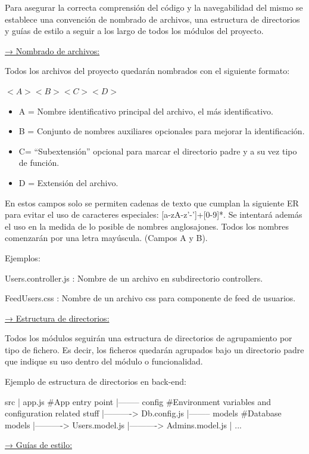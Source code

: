 \documentclass{article}
\begin{document}
Para asegurar la correcta comprensión del código y la navegabilidad del mismo se establece una convención 
de nombrado de archivos, una estructura de directorios y guías de estilo a seguir a los largo de todos los 
módulos del proyecto.

\underline{→ Nombrado de archivos:}

Todos los archivos del proyecto quedarán nombrados con el siguiente formato:

$<A><B><C><D>$

\begin{itemize} %
    \item A = Nombre identificativo principal del archivo, el más identificativo.
    \item B = Conjunto de nombres auxiliares opcionales para mejorar la identificación.
    \item C= “Subextensión” opcional para marcar el directorio padre y a su vez tipo de función.
    \item D = Extensión del archivo.
\end{itemize}

En estos campos solo se permiten cadenas de texto que cumplan la siguiente ER para evitar el uso de 
caracteres especiales: [a-zA-z'-']+[0-9]*.
Se intentará además el uso en la medida de lo posible de nombres anglosajones.
Todos los nombres comenzarán por una letra mayúscula. (Campos A y B).

Ejemplos: 

Users.controller.js : Nombre de un archivo en subdirectorio controllers.

FeedUsers.css :  Nombre de un archivo css para componente de feed de usuarios.
\pagebreak

\underline{→ Estructura de directorios:}

Todos los módulos seguirán una estructura de directorios de agrupamiento por tipo de fichero. 
Es decir, los ficheros quedarán agrupados bajo un directorio padre que indique su uso dentro del módulo o funcionalidad.

Ejemplo de estructura de directorios en back-end:

src
|	app.js	\#App entry point
|-------- config 	\#Environment variables and configuration related stuff
|----------> Db.config.js
|-------- models \#Database models
|----------> Users.model.js
|----------> Admins.model.js
| ...


\underline{→ Guías de estilo:}
\end{document}
